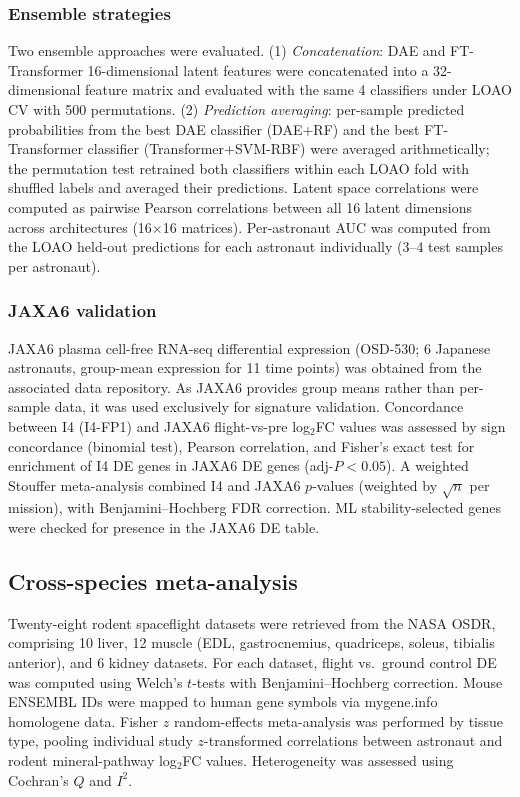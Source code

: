 \documentclass[11pt,a4paper]{article}
\begin{document}
\subsubsection{Ensemble strategies}

Two ensemble approaches were evaluated. (1) \textit{Concatenation}: DAE and FT-Transformer 16-dimensional latent features were concatenated into a 32-dimensional feature matrix and evaluated with the same 4 classifiers under LOAO CV with 500 permutations. (2) \textit{Prediction averaging}: per-sample predicted probabilities from the best DAE classifier (DAE+RF) and the best FT-Transformer classifier (Transformer+SVM-RBF) were averaged arithmetically; the permutation test retrained both classifiers within each LOAO fold with shuffled labels and averaged their predictions. Latent space correlations were computed as pairwise Pearson correlations between all 16 latent dimensions across architectures (16$\times$16 matrices). Per-astronaut AUC was computed from the LOAO held-out predictions for each astronaut individually (3--4 test samples per astronaut).

\subsubsection{JAXA6 validation}

JAXA6 plasma cell-free RNA-seq differential expression (OSD-530; 6 Japanese astronauts, group-mean expression for 11 time points) was obtained from the associated data repository. As JAXA6 provides group means rather than per-sample data, it was used exclusively for signature validation. Concordance between I4 (I4-FP1) and JAXA6 flight-vs-pre log$_2$FC values was assessed by sign concordance (binomial test), Pearson correlation, and Fisher's exact test for enrichment of I4 DE genes in JAXA6 DE genes (adj-$P < 0.05$). A weighted Stouffer meta-analysis combined I4 and JAXA6 $p$-values (weighted by $\sqrt{n}$ per mission), with Benjamini--Hochberg FDR correction. ML stability-selected genes were checked for presence in the JAXA6 DE table.

\subsection{Cross-species meta-analysis}

Twenty-eight rodent spaceflight datasets were retrieved from the NASA OSDR, comprising 10 liver, 12 muscle (EDL, gastrocnemius, quadriceps, soleus, tibialis anterior), and 6 kidney datasets. For each dataset, flight vs.\ ground control DE was computed using Welch's $t$-tests with Benjamini--Hochberg correction. Mouse ENSEMBL IDs were mapped to human gene symbols via mygene.info homologene data. Fisher $z$ random-effects meta-analysis was performed by tissue type, pooling individual study $z$-transformed correlations between astronaut and rodent mineral-pathway log$_2$FC values. Heterogeneity was assessed using Cochran's $Q$ and $I^2$.
\end{document}
